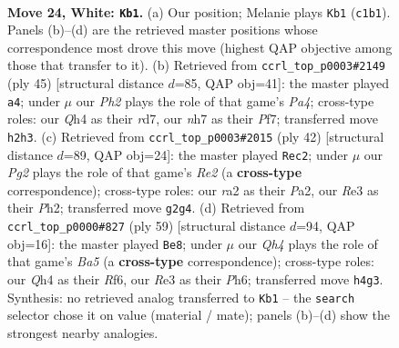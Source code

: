 \documentclass[11pt]{article}
\begin{document}
\clearpage

\begin{figure}[p]\centering
\begin{subfigure}{0.46\textwidth}\centering
\resizebox{\linewidth}{!}{%
\newchessgame
\chessboard[
  setfen={2k2b1r/1p2pp1n/1B1p2p1/1b6/3PP2Q/1P2RP2/r5PP/2K4R w - - 0 24},
  showmover=false,
  pgfstyle=straightmove, color=movearrow, markmove={c1-b1}
]}
\caption{}
\end{subfigure}\hfill
\begin{subfigure}{0.46\textwidth}\centering
\resizebox{\linewidth}{!}{%
\newchessgame
\chessboard[
  setfen={r5k1/1p1R1pb1/3Bp3/pr4pp/8/1P2P3/P4PPP/1K1R4 b - - 1 23},
  showmover=false,
  pgfstyle=straightmove, color=movearrow, markmove={a5-a4}
]}
\caption{}
\end{subfigure}
\\[4pt]
\begin{subfigure}{0.46\textwidth}\centering
\resizebox{\linewidth}{!}{%
\newchessgame
\chessboard[
  setfen={2r2bk1/p4p2/1np3pp/4p3/3rP3/1B2NP2/PP2RP1P/2R3K1 w - - 8 22},
  showmover=false,
  pgfstyle=straightmove, color=movearrow, markmove={e2-c2}
]}
\caption{}
\end{subfigure}\hfill
\begin{subfigure}{0.46\textwidth}\centering
\resizebox{\linewidth}{!}{%
\newchessgame
\chessboard[
  setfen={8/1pk1r1p1/p3pr1p/3p3P/bP3P2/P2B2P1/2PR4/1K2R3 b - - 4 30},
  showmover=false,
  pgfstyle=straightmove, color=movearrow, markmove={a4-e8}
]}
\caption{}
\end{subfigure}
\caption{\textbf{Move 24, White: \texttt{Kb1}.} (a) Our position; Melanie plays \texttt{Kb1} (\texttt{c1b1}). Panels (b)--(d) are the retrieved master positions whose correspondence most drove this move (highest QAP objective among those that transfer to it). (b) Retrieved from \texttt{ccrl\_top\_p0003\#2149} (ply 45) [structural distance $d$=85, QAP obj=41]: the master played \texttt{a4}; under $\mu$ our \emph{Ph2} plays the role of that game's \emph{Pa4}; cross-type roles: our \emph{Q}h4 as their \emph{r}d7, our \emph{n}h7 as their \emph{P}f7; transferred move \texttt{h2h3}. (c) Retrieved from \texttt{ccrl\_top\_p0003\#2015} (ply 42) [structural distance $d$=89, QAP obj=24]: the master played \texttt{Rec2}; under $\mu$ our \emph{Pg2} plays the role of that game's \emph{Re2} (a \textbf{cross-type} correspondence); cross-type roles: our \emph{r}a2 as their \emph{P}a2, our \emph{R}e3 as their \emph{P}h2; transferred move \texttt{g2g4}. (d) Retrieved from \texttt{ccrl\_top\_p0000\#827} (ply 59) [structural distance $d$=94, QAP obj=16]: the master played \texttt{Be8}; under $\mu$ our \emph{Qh4} plays the role of that game's \emph{Ba5} (a \textbf{cross-type} correspondence); cross-type roles: our \emph{Q}h4 as their \emph{R}f6, our \emph{R}e3 as their \emph{P}h6; transferred move \texttt{h4g3}. Synthesis: no retrieved analog transferred to \texttt{Kb1} -- the \texttt{search} selector chose it on value (material / mate); panels (b)--(d) show the strongest nearby analogies.}
\label{fig:thought-m46}
\end{figure}
\end{document}
